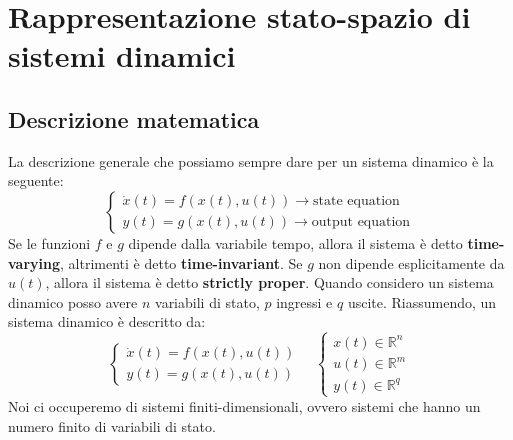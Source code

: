 \section{Rappresentazione stato-spazio di sistemi dinamici}
\subsection{Descrizione matematica}
La descrizione generale che possiamo sempre dare per un sistema dinamico è la
seguente:
\begin{equation}
    \begin{cases}
        \dot{x}(t) = f(x(t), u(t)) \rightarrow \text{state equation} \\
        y(t) = g(x(t), u(t)) \rightarrow \text{output equation}
    \end{cases}
\end{equation}
Se le funzioni $f$ e $g$ dipende dalla variabile tempo, allora il sistema è detto \textbf{time-varying}, altrimenti è detto \textbf{time-invariant}.
Se $g$ non dipende esplicitamente da $u(t)$, allora il sistema è detto \textbf{strictly proper}.
Quando considero un sistema dinamico posso avere $n$ variabili di stato, $p$ ingressi e $q$ uscite.
Riassumendo, un sistema dinamico è descritto da:
\begin{equation}
    \begin{cases}
        \dot{x}(t) = f(x(t), u(t)) \\
        y(t) = g(x(t), u(t))
    \end{cases}
    \quad
    \begin{cases}
        x(t) \in \mathbb{R}^n \\
        u(t) \in \mathbb{R}^m \\
        y(t) \in \mathbb{R}^q
    \end{cases}
\end{equation}
Noi ci occuperemo di sistemi finiti-dimensionali, ovvero sistemi che hanno un numero finito di variabili di stato.

